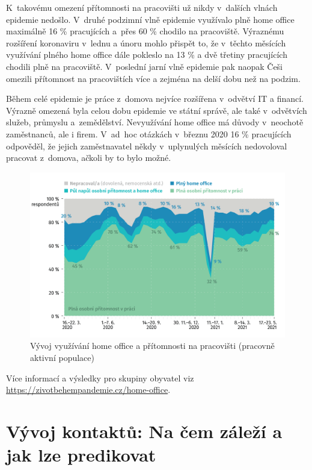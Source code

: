 K takovému omezení přítomnosti na pracovišti už nikdy v dalších vlnách epidemie nedošlo. V druhé podzimní vlně epidemie využívalo plně home office maximálně 16 \% pracujících a přes 60 \% chodilo na pracoviště. Výraznému rozšíření koronaviru v lednu a únoru mohlo přispět to, že v těchto měsících využívání plného home office dále pokleslo na 13 \% a dvě třetiny pracujících chodili plně na pracoviště. V poslední jarní vlně epidemie pak naopak Češi omezili přítomnost na pracovištích více a zejména na delší dobu než na podzim.

Během celé epidemie je práce z domova nejvíce rozšířena v odvětví IT a financí. Výrazně omezená byla celou dobu epidemie ve státní správě, ale také v odvětvích služeb, průmyslu a zemědělství. Nevyužívání home office má důvody v neochotě zaměstnanců, ale i firem. V ad hoc otázkách v březnu 2020 16 \% pracujících odpověděl, že jejich zaměstnavatel někdy v uplynulých měsících nedovoloval pracovat z domova, ačkoli by to bylo možné.

\begin{figure}[ht]
    \centering
    \includegraphics[width=\textwidth]{./pic/zbp-graf4.png}
    \caption{Vývoj využívání home office a přítomnosti na pracovišti (pracovně aktivní populace)}
    \label{fig:zbp4}
\end{figure}

Více informací a výsledky pro skupiny obyvatel viz \url{https://zivotbehempandemie.cz/home-office}.

\section*{Vývoj kontaktů: Na čem záleží a jak lze predikovat}

